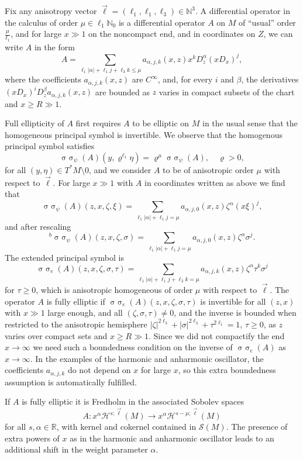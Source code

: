 \documentclass[reqno]{amsart}
\numberwithin{equation}{section}
\theoremstyle{definition}
\def\N{\mathbb N}
\def\R{\mathbb R}
\def\S{\mathscr S}
\DeclareMathOperator{\sym}{ \sigma\!\!\!\sigma}
\begin{document}
Fix any anisotropy vector $\vec{\ell} = (\ell_1,\ell_1,\ell_3) \in \N^3$. A differential operator in the calculus of order $\mu \in \ell_1\N_0$ is a differential operator $A$ on $M$ of ``usual'' order $\frac{\mu}{\ell_1}$, and for large $x \gg 1$ on the noncompact end, and in coordinates on $Z$, we can write $A$ in the form
$$
A = \sum\limits_{\ell_1|\alpha| + \ell_1 j + \ell_3 k \leq \mu} a_{\alpha,j,k}(x,z)x^kD_z^{\alpha}(xD_x)^j,
$$
where the coefficients $a_{\alpha,j,k}(x,z)$ are $C^{\infty}$, and, for every $i$ and $\beta$, the derivatives $(xD_x)^iD_z^{\beta}a_{\alpha,j,k}(x,z)$ are bounded as $z$ varies in compact subsets of the chart and $x \geq R \gg 1$.

Full ellipticity of $A$ first requires $A$ to be elliptic on $M$ in the usual sense that the homogeneous principal symbol is invertible. We observe that the homogenous principal symbol satisfies
$$
\sym_{\psi}(A)(y,\varrho^{\ell_1}\eta) = \varrho^{\mu}\sym_{\psi}(A), \quad \varrho > 0,
$$
for all $(y,\eta) \in T^*M\setminus 0$, and we consider $A$ to be of anisotropic order $\mu$ with respect to $\vec{\ell}$. For large $x \gg 1$ with $A$ in coordinates written as above we find that
$$
\sym_{\psi}(A)(z,x,\zeta,\xi) = \sum\limits_{\ell_1|\alpha| + \ell_1 j = \mu} a_{\alpha,j,0}(x,z)\zeta^{\alpha}(x\xi)^j,
$$
and after rescaling
$$
{}^b\sym_{\psi}(A)(z,x,\zeta,\sigma) = \sum\limits_{\ell_1|\alpha| + \ell_1 j = \mu} a_{\alpha,j,0}(x,z)\zeta^{\alpha}\sigma^j.
$$
The extended principal symbol is
$$
\sym_e(A)(z,x,\zeta,\sigma,\tau) = \sum\limits_{\ell_1|\alpha| + \ell_1 j + \ell_3 k = \mu} a_{\alpha,j,k}(x,z)\zeta^{\alpha}\tau^k\sigma^j
$$
for $\tau \geq 0$, which is anisotropic homogeneous of order $\mu$ with respect to $\vec{\ell}$. The operator $A$ is fully elliptic if $\sym_e(A)(z,x,\zeta,\sigma,\tau)$ is invertible for all $(z,x)$ with $x \gg 1$ large enough, and all $(\zeta,\sigma,\tau) \neq 0$, and the inverse is bounded when restricted to the anisotropic hemisphere $|\zeta|^{2\ell_3} + |\sigma|^{2\ell_3} + \tau^{2\ell_1} = 1$, $\tau \geq 0$, as $z$ varies over compact sets and $x \geq R \gg 1$. Since we did not compactify the end $x \to \infty$ we need such a boundedness condition on the inverse of $\sym_e(A)$ as $x \to \infty$. In the examples of the harmonic and anharmonic oscillator, the coefficients $a_{\alpha,j,k}$ do not depend on $x$ for large $x$, so this extra boundedness assumption is automatically fulfilled.

If $A$ is fully elliptic it is Fredholm in the associated Sobolev spaces
$$
A : x^{\alpha}{\mathscr H}^{s;\vec{\ell}}(M) \to x^{\alpha}{\mathscr H}^{s-\mu;\vec{\ell}}(M)
$$
for all $s,\alpha \in \R$, with kernel and cokernel contained in $\S(M)$. The presence of extra powers of $x$ as in the harmonic and anharmonic oscillator leads to an additional shift in the weight parameter $\alpha$.
\end{document}
